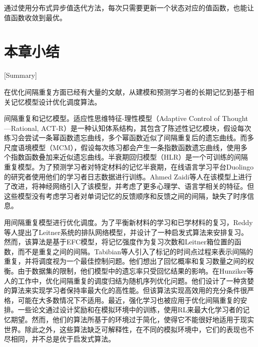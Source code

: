 通过使用分布式异步值迭代方法，每次只需要更新一个状态对应的值函数，也能让值函数收敛到最优\cite[197-200]{bertsekasReinforcementLearningOptimal2019}。

\section{本章小结}[Summary]

在优化间隔重复方面已经有大量的文献，从建模和预测学习者的长期记忆到基于相关记忆模型设计优化调度算法。

间隔重复和记忆模型。适应性思维特征-理性模型（Adaptive Control of Thought—Rational, ACT-R）\cite{andersonIntegratedTheoryMind2004}是一种认知体系结构，其包含了陈述性记忆模块，假设每次练习会尝试一条幂函数遗忘曲线，多个幂函数近似了间隔重复后的遗忘曲线。而多尺度语境模型（MCM）\cite{pashlerPredictingOptimalSpacing2009}，假设每次练习都会产生一条指数函数遗忘曲线，使用多个指数函数叠加来近似遗忘曲线。半衰期回归模型（HLR）\cite{settlesTrainableSpacedRepetition2016}是一个可训练的间隔重复模型。为了预测学习者对特定材料的记忆半衰期，在线语言学习平台Duolingo的研究者使用他们的学习者日志数据进行训练。Ahmed Zaidi等人\cite{zaidiAdaptiveForgettingCurves2020}在该模型上进行了改进，将神经网络引入了该模型，并考虑了更多心理学、语言学相关的特征。但这些模型没有考虑学习者对单词记忆的反馈顺序和反馈之间的间隔，缺失了时序信息。

用间隔重复模型进行优化调度。为了平衡新材料的学习和已学材料的复习，Reddy等人\cite{reddyUnboundedHumanLearning2016}提出了Leitner系统\cite{leitnerLerntManLeben1974}的排队网络模型，并设计了一种启发式算法来安排复习。然而，该算法是基于EFC模型\cite{reddyUnboundedHumanLearning2016}，将记忆强度作为复习次数和Leitner箱位置的函数，而不是重复之间的间隔。Tabibian等人\cite{tabibianEnhancingHumanLearning2019}引入了标记的时间点过程来表示间隔的重复，并将调度视为一个最佳控制问题。他们想出了回忆概率和复习数量之间的权衡。由于数据集的限制，他们模型中的遗忘率只受回忆结果的影响。在Hunziker等人\cite{hunzikerTeachingMultipleConcepts2019}的工作中，优化间隔重复的调度归结为随机序列优化问题。他们设计了一种贪婪的算法来实现学习者保持率最大化的高性能。但该算法实现高效用的充分条件很严格，可能在大多数情况下不适用。最近，强化学习也被应用于优化间隔重复的安排。一些论文\cite{reddyAcceleratingHumanLearning2017,upadhyayDeepReinforcementLearning2018,sinhaUsingDeepReinforcement2019,yangTADSLearningTimeaware2020}通过设计奖励和在模拟环境中的训练，使用RL来最大化学习者的记忆期望。然而，他们的算法所基于的环境过于简化，使得它不能很好地适用于现实世界。除此之外，这些算法缺乏可解释性，在不同的模拟环境中，它们的表现也不尽相同，并不总是优于启发式算法。

